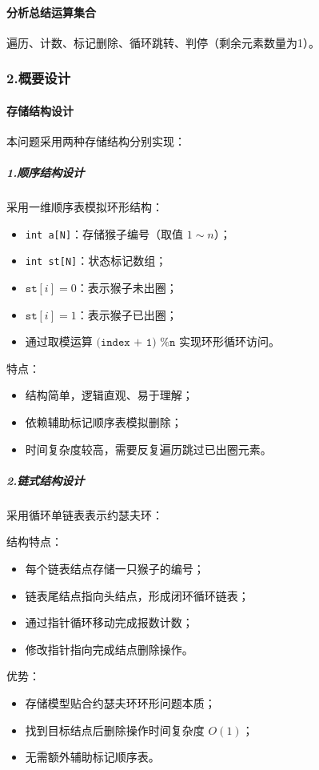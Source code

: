 \documentclass{ctexart}
\begin{document}
\paragraph{分析总结运算集合}
遍历、计数、标记删除、循环跳转、判停（剩余元素数量为1）。

\subsubsection{2.概要设计}
\paragraph{存储结构设计}
本问题采用两种存储结构分别实现：

\subparagraph{1.顺序结构设计}
采用一维顺序表模拟环形结构：
\begin{itemize}
    \item \texttt{int a[N]}：存储猴子编号（取值 $1 \sim n$）；
    \item \texttt{int st[N]}：状态标记数组；
    \item $\texttt{st}[i] = 0$：表示猴子未出圈；
    \item $\texttt{st}[i] = 1$：表示猴子已出圈；
    \item 通过取模运算 $\texttt{(index + 1) \% n}$ 实现环形循环访问。
\end{itemize}

特点：
\begin{itemize}
    \item 结构简单，逻辑直观、易于理解；
    \item 依赖辅助标记顺序表模拟删除；
    \item 时间复杂度较高，需要反复遍历跳过已出圈元素。
\end{itemize}

\subparagraph{2.链式结构设计}
采用循环单链表表示约瑟夫环：

结构特点：
\begin{itemize}
    \item 每个链表结点存储一只猴子的编号；
    \item 链表尾结点指向头结点，形成闭环循环链表；
    \item 通过指针循环移动完成报数计数；
    \item 修改指针指向完成结点删除操作。
\end{itemize}

优势：
\begin{itemize}
    \item 存储模型贴合约瑟夫环环形问题本质；
    \item 找到目标结点后删除操作时间复杂度 $O(1)$；
    \item 无需额外辅助标记顺序表。
\end{itemize}
\end{document}
